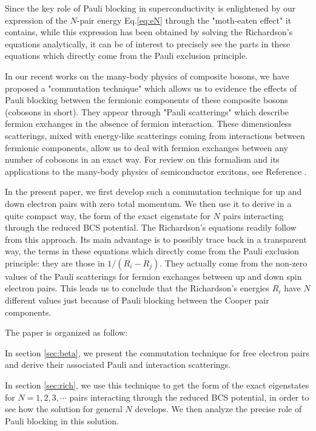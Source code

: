 \documentclass[aps,prb,superscriptaddress,twocolumn]{revtex4}
\begin{document}
Since the key role of Pauli blocking in superconductivity is enlightened by
our expression of the $N$-pair energy Eq.\eqref{eq:eN} through the "moth-eaten effect" it contains, while this expression has been obtained by solving the
Richardson's equations analytically, it can be of interest to precisely see the parts in
these equations which directly come from the Pauli exclusion principle.

In our recent works on the many-body physics of composite bosons, we have
proposed a "commutation technique" which allows us to evidence the effects
of Pauli blocking between the fermionic components of these composite
bosons (cobosons in short). They appear through "Pauli scatterings" which describe fermion
exchanges in the absence of fermion interaction. These dimensionless
scatterings, mixed with energy-like scatterings coming from interactions
between fermionic components, allow us to deal with fermion exchanges
between any number of cobosons in an exact way. For review on
this formalism and its applications to the many-body physics of
semiconductor excitons, see Reference \cite%
{CobosonPhysicsReports,CobosonCalculation}.

In the present paper, we first develop such a commutation technique for up and down
electron pairs with zero total momentum. We then use it to derive in a quite
compact way, the form of the exact eigenstate for $N$ pairs interacting
through the reduced BCS potential. The Richardson's equations readily follow
from this approach. Its main advantage is to possibly trace back in a
transparent way, the terms in these equations which directly come from the
Pauli exclusion principle: they are those in $1/(R_i-R_j)$. They actually come
from the non-zero values of the Pauli scatterings for fermion exchanges between up and down spin electron pairs. This leads us to conclude that the Richardson's energies $R_i$  have $N$ different values just because of Pauli blocking between the Cooper pair components.

The paper is organized as follow:

In section \ref{sec:beta}, we present the commutation technique for free
electron pairs and derive their associated Pauli and interaction scatterings.

In section \ref{sec:rich}, we use this technique to get the form of the
exact eigenstates for $N=1,2,3,\cdots$ pairs interacting through the reduced
BCS potential, in order to see how the solution for general $N$ develops. We
then analyze the precise role of Pauli blocking in this solution.
\end{document}
